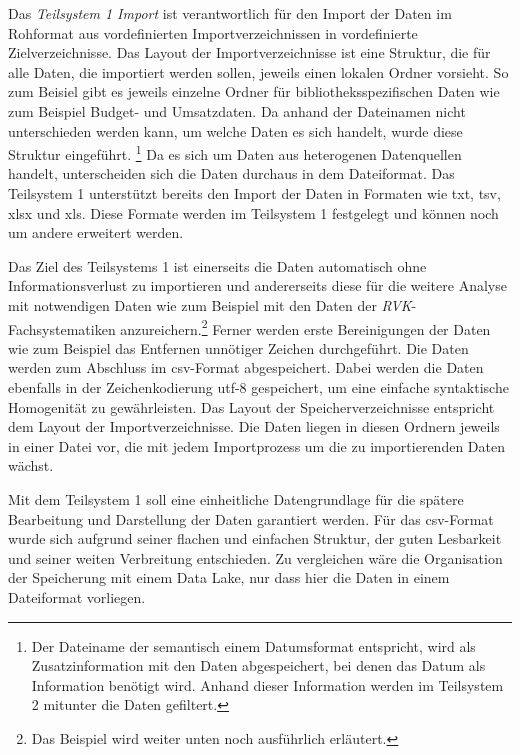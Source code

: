     Das \textit{Teilsystem 1 Import} ist verantwortlich für den Import der Daten im Rohformat aus vordefinierten Importverzeichnissen 
    in vordefinierte Zielverzeichnisse. Das Layout der Importverzeichnisse ist eine Struktur, die für alle Daten, die importiert werden sollen,
    jeweils einen lokalen Ordner vorsieht. So zum Beisiel gibt es jeweils einzelne Ordner für bibliotheksspezifischen Daten wie zum Beispiel Budget- und Umsatzdaten.
    Da anhand der Dateinamen nicht unterschieden werden kann, um welche Daten es sich handelt, wurde diese Struktur eingeführt. 
    \footnote{Der Dateiname der semantisch einem Datumsformat entspricht, wird als Zusatzinformation mit den Daten abgespeichert, bei denen das Datum als Information benötigt wird.
    Anhand dieser Information werden im Teilsystem 2 mitunter die Daten gefiltert.} 
    Da es sich um Daten aus heterogenen Datenquellen handelt, unterscheiden sich die Daten durchaus in dem Dateiformat. 
    Das Teilsystem 1 unterstützt bereits den Import der Daten in Formaten wie txt, tsv, xlsx und xls. Diese Formate werden im Teilsystem 1 festgelegt
    und können noch um andere erweitert werden.
    
    Das Ziel des Teilsystems 1 ist einerseits die Daten automatisch ohne Informationsverlust zu importieren 
    und andererseits diese für die weitere Analyse mit notwendigen Daten wie zum Beispiel mit den Daten 
    der \textit{\acrshort{RVK}}-Fachsystematiken anzureichern.\footnote{Das Beispiel wird weiter unten noch ausführlich erläutert.}
    Ferner werden erste Bereinigungen der Daten wie zum Beispiel das Entfernen unnötiger Zeichen durchgeführt. Die Daten werden zum Abschluss im csv-Format abgespeichert. 
    Dabei werden die Daten ebenfalls in der Zeichenkodierung utf-8 gespeichert, um eine einfache syntaktische Homogenität zu gewährleisten. Das Layout der Speicherverzeichnisse
    entspricht dem Layout der Importverzeichnisse. Die Daten liegen in diesen Ordnern jeweils in einer Datei vor, die mit jedem Importprozess um die zu importierenden Daten wächst.

    Mit dem Teilsystem 1 soll eine einheitliche Datengrundlage für die spätere Bearbeitung und Darstellung der Daten garantiert werden. Für das csv-Format wurde sich aufgrund seiner flachen und einfachen Struktur, der guten Lesbarkeit
    und seiner weiten Verbreitung entschieden. Zu vergleichen wäre die Organisation der Speicherung mit einem Data Lake, nur dass hier die Daten in einem Dateiformat vorliegen.
    
